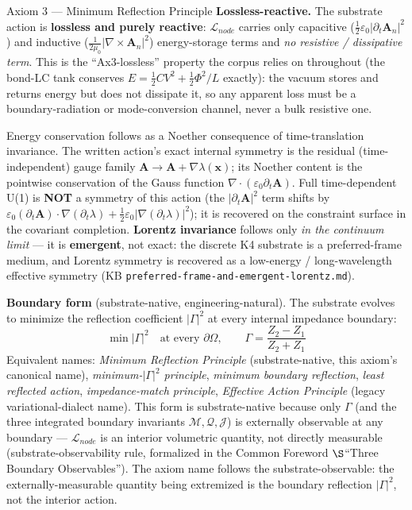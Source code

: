 \begin{resultbox}{Axiom 3 — Minimum Reflection Principle}
\medskip\noindent\textbf{Lossless-reactive.} The substrate action is \textbf{lossless and purely reactive}: $\mathcal{L}_{node}$ carries only capacitive ($\tfrac12\varepsilon_0|\partial_t\mathbf{A}_n|^2$) and inductive ($\tfrac{1}{2\mu_0}|\nabla\times\mathbf{A}_n|^2$) energy-storage terms and \emph{no resistive / dissipative term}. This is the ``Ax3-lossless'' property the corpus relies on throughout (the bond-LC tank conserves $E = \tfrac12 C V^2 + \tfrac12\Phi^2/L$ exactly): the vacuum stores and returns energy but does not dissipate it, so any apparent loss must be a boundary-radiation or mode-conversion channel, never a bulk resistive one.

\medskip\noindent
Energy conservation follows as a Noether consequence of time-translation invariance. The written action's exact internal symmetry is the residual (time-independent) gauge family $\mathbf{A} \to \mathbf{A} + \nabla\lambda(\mathbf{x})$; its Noether content is the pointwise conservation of the Gauss function $\nabla\cdot(\varepsilon_0\partial_t\mathbf{A})$. Full time-dependent U(1) is \textbf{NOT} a symmetry of this action (the $|\partial_t\mathbf{A}|^2$ term shifts by $\varepsilon_0(\partial_t\mathbf{A})\cdot\nabla(\partial_t\lambda) + \tfrac12\varepsilon_0|\nabla(\partial_t\lambda)|^2$); it is recovered on the constraint surface in the covariant completion. \textbf{Lorentz invariance} follows only \emph{in the continuum limit} --- it is \textbf{emergent}, not exact: the discrete K4 substrate is a preferred-frame medium, and Lorentz symmetry is recovered as a low-energy / long-wavelength effective symmetry (KB \texttt{preferred-frame-and-emergent-lorentz.md}).

\medskip\noindent\textbf{Boundary form} (substrate-native, engineering-natural). The substrate evolves to minimize the reflection coefficient $|\Gamma|^2$ at every internal impedance boundary:
\begin{equation}
    \min |\Gamma|^2 \quad \text{at every } \partial\Omega,\qquad
    \Gamma = \frac{Z_2 - Z_1}{Z_2 + Z_1}
    \label{eq:axiom3_boundary}
\end{equation}
Equivalent names: \textit{Minimum Reflection Principle} (substrate-native, this axiom's canonical name), \textit{minimum-$|\Gamma|^2$ principle}, \textit{minimum boundary reflection}, \textit{least reflected action}, \textit{impedance-match principle}, \textit{Effective Action Principle} (legacy variational-dialect name). This form is substrate-native because only $\Gamma$ (and the three integrated boundary invariants $\mathcal{M}, \mathcal{Q}, \mathcal{J}$) is externally observable at any boundary --- $\mathcal{L}_{node}$ is an interior volumetric quantity, not directly measurable (substrate-observability rule, formalized in the Common Foreword $\S$``Three Boundary Observables''). The axiom name follows the substrate-observable: the externally-measurable quantity being extremized is the boundary reflection $|\Gamma|^2$, not the interior action.


\end{resultbox}
